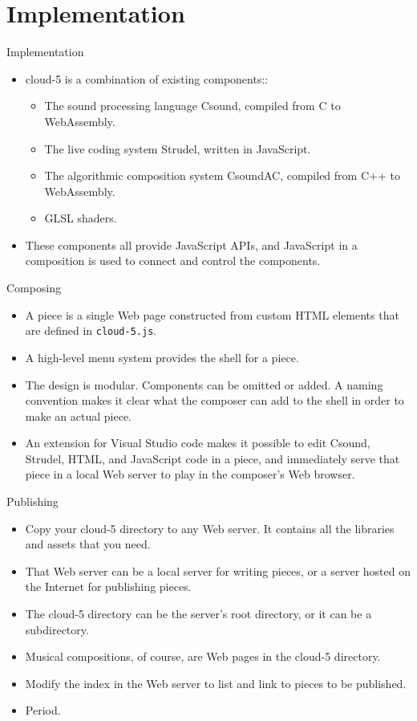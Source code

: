\documentclass{beamer}
\begin{document}
\section{Implementation}
\begin{frame}{Implementation}
\begin{itemize}
\item cloud-5 is a combination of existing components::
\begin{itemize}
\item The sound processing language Csound, compiled from C to WebAssembly.
\item The live coding system Strudel, written in JavaScript.
\item The algorithmic composition system CsoundAC, compiled from C++ to WebAssembly.
\item GLSL shaders.
\end{itemize}
\item These components all provide JavaScript APIs, and JavaScript in a composition is used to connect and control the components.
\end{itemize}
\end{frame}

\begin{frame}{Composing}
\begin{itemize}
\item A piece is a single Web page constructed from custom HTML elements that are defined in \texttt{cloud-5.js}.
\item A high-level menu system provides the shell for a piece.
\item The design is modular. Components can be omitted or added. A naming convention makes it clear what the composer can add to the shell in order to make an actual piece.
\item An extension for Visual Studio code makes it possible to edit Csound, Strudel, HTML, and JavaScript code in a piece, and immediately serve that piece in a local Web server to play in the composer's Web browser.
\end{itemize}
\end{frame}

\begin{frame}{Publishing}
\begin{itemize}
\item Copy your cloud-5 directory to any Web server. It contains all the libraries and assets that you need.
\item That Web server can be a local server for writing pieces, or a server hosted on the Internet for publishing pieces.
\item The cloud-5 directory can be the server's root directory, or it can be a subdirectory.
\item Musical compositions, of course, are Web pages in the cloud-5 directory.
\item Modify the index in the Web server to list and link to pieces to be published.
\item Period.
\end{itemize}
\end{frame}
\end{document}
